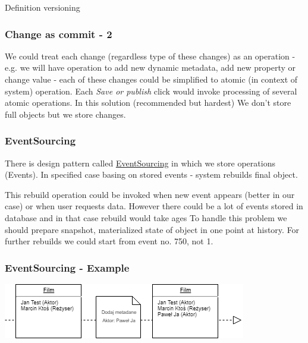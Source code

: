 \documentclass{beamer}
\begin{document}
\begin{section}{Definition versioning}
\begin{frame}
\end{frame}

\begin{frame}
\frametitle{Change as commit - 2}
We could treat each change (regardless type of these changes) as an operation - e.g. we will have operation to add new dynamic metadata, add new property or change value - each of these changes could be simplified to atomic (in context of system) operation. \newline \newline
Each \textit{Save or publish} click would invoke processing of several atomic operations.  In this solution (recommended but hardest) We don't store full objects but we store changes.
\end{frame}

\begin{frame}
\frametitle {EventSourcing}
There is design pattern called \href{https://martinfowler.com/eaaDev/EventSourcing.html}{EventSourcing} in which we store operations (Events). In specified case basing on stored events - system rebuilds final object. \newline \newline

This rebuild operation could be invoked when new event appears (better in our case) or when user requests data. \newline
However there could be a lot of events stored in database and in that case rebuild would take ages \newline \newline To handle this problem we should prepare snapshot, materialized state of object in one point at history. For further rebuilds we could start from event no. 750, not 1. 
\end{frame}

\begin{frame}
\frametitle {EventSourcing - Example}

\begin{center}

 \includegraphics{EventSourcingBase.png}

\end{center}

\end{frame}


\end{section}
\end{document}
